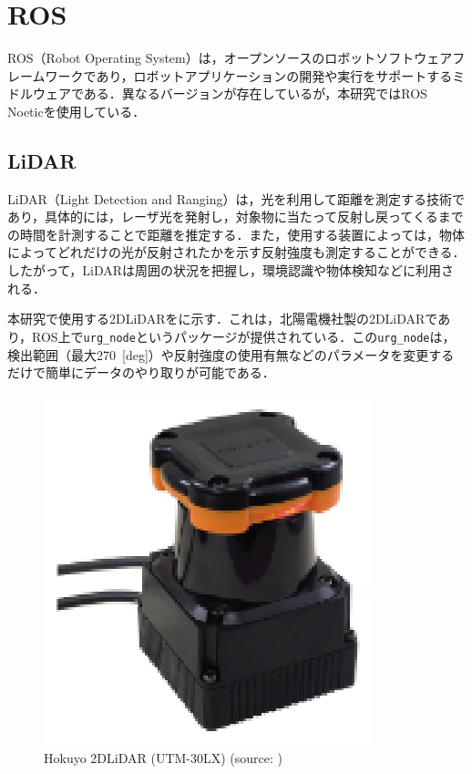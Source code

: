 
\section{ROS}

ROS（Robot Operating System）\cite{ros}は，オープンソースのロボットソフトウェアフレームワークであり，ロボットアプリケーションの開発や実行をサポートするミドルウェアである．異なるバージョンが存在しているが，本研究ではROS Noeticを使用している．

\subsection{LiDAR}

  LiDAR（Light Detection and Ranging）は，光を利用して距離を測定する技術であり，具体的には，レーザ光を発射し，対象物に当たって反射し戻ってくるまでの時間を計測することで距離を推定する．また，使用する装置によっては，物体によってどれだけの光が反射されたかを示す反射強度も測定することができる．したがって，LiDARは周囲の状況を把握し，環境認識や物体検知などに利用される．

  本研究で使用する2DLiDARをに示す．これは，北陽電機社製の2DLiDARであり，ROS上で\texttt{urg\_node}\cite{urg_node}というパッケージが提供されている．この\texttt{urg\_node}は，検出範囲（最大270 \,[deg]）や反射強度の使用有無などのパラメータを変更するだけで簡単にデータのやり取りが可能である．

  \begin{figure}[h]
    \centering
    \includegraphics[keepaspectratio, scale=0.80] {images/eps/RobotGuidance_hokuyo_lidar}
    \caption[Hokuyo 2DLiDAR (UTM-30LX)]{Hokuyo 2DLiDAR (UTM-30LX) (source: \cite{hokuyo})}
    \label{Fig:hokuyo_lidar}
  \end{figure}

